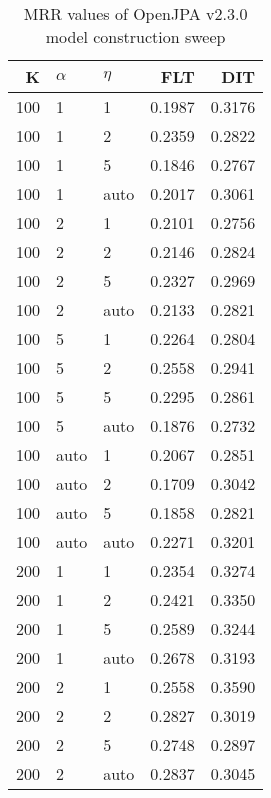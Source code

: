 
\begin{table}
\begin{spacing}{1.2}
\centering
\caption{MRR values of OpenJPA v2.3.0 model construction sweep}
\label{table:openjpa_model_sweep}
\vspace{0.2em}
\parbox{.45\linewidth}{\centering \begin{tabular}{rll|rr}
\toprule
   K & $\alpha$ &   $\eta$ & FLT & DIT \\
\midrule
 100 &     1 &     1 &           0.1987 & 0.3176 \\
 100 &     1 &     2 &           0.2359 & 0.2822 \\
 100 &     1 &     5 &           0.1846 & 0.2767 \\
 100 &     1 &  auto &           0.2017 & 0.3061 \\
 100 &     2 &     1 &           0.2101 & 0.2756 \\
 100 &     2 &     2 &           0.2146 & 0.2824 \\
 100 &     2 &     5 &           0.2327 & 0.2969 \\
 100 &     2 &  auto &           0.2133 & 0.2821 \\
 100 &     5 &     1 &           0.2264 & 0.2804 \\
 100 &     5 &     2 &           0.2558 & 0.2941 \\
 100 &     5 &     5 &           0.2295 & 0.2861 \\
 100 &     5 &  auto &           0.1876 & 0.2732 \\
 100 &  auto &     1 &           0.2067 & 0.2851 \\
 100 &  auto &     2 &           0.1709 & 0.3042 \\
 100 &  auto &     5 &           0.1858 & 0.2821 \\
 100 &  auto &  auto &           0.2271 & 0.3201 \\
 200 &     1 &     1 &           0.2354 & 0.3274 \\
 200 &     1 &     2 &           0.2421 & 0.3350 \\
 200 &     1 &     5 &           0.2589 & 0.3244 \\
 200 &     1 &  auto &           0.2678 & 0.3193 \\
 200 &     2 &     1 &           0.2558 & 0.3590 \\
 200 &     2 &     2 &           0.2827 & 0.3019 \\
 200 &     2 &     5 &           0.2748 & 0.2897 \\
 200 &     2 &  auto &           0.2837 & 0.3045 \\

\end{tabular}}
\end{spacing}
\end{table}
